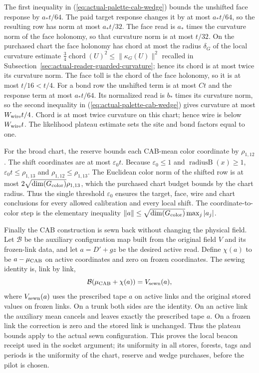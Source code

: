 The first inequality in (\ref{eq:actual-palette-cab-wedge}) bounds the
unshifted face response by $a_*t/64$. The paid target response changes it
by at most $a_*t/64$, so the resulting row has norm at most $a_*t/32$.
The face read is $a_*$ times the curvature norm of the face holonomy, so
that curvature norm is at most $t/32$. On the purchased chart the face
holonomy has chord at most the radius $\delta_G$ of the local curvature
estimate $\tfrac34\operatorname{chord}(U)^2\leq\|\kappa_G(U)\|^2$ recalled
in Subsection~\ref{sec:actual-reader-guarded-curvature}; hence its chord is at
most twice its curvature norm. The face toll is the chord of the face
holonomy, so it is at most $t/16<t/4$. For a bond row the unshifted term is at most $Ct$
and the response term at most $a_*t/64$. Its normalized read is $b_*$
times its curvature norm, so the second inequality in
(\ref{eq:actual-palette-cab-wedge}) gives curvature at most
$W_{\rm wire}t/4$. Chord is at most twice curvature on this chart; hence
wire is below $W_{\rm wire}t$. The likelihood plateau estimate sets the
site and bond factors equal to one.

For the broad chart, the reserve bounds each CAB-mean color coordinate by
$\rho_{1,12}$. The shift coordinates are at most $\varepsilon_0t$.
Because $\varepsilon_0\leq1$ and $\operatorname{radiusB}(x)\geq1$,
$\varepsilon_0t\leq\rho_{1,13}$ and $\rho_{1,12}\leq\rho_{1,13}$.
The Euclidean color norm of the shifted row is at most
$2\sqrt{\dim(G_{\rm color})}\rho_{1,13}$, which the purchased chart
budget bounds by the chart radius. Thus the single threshold
$\varepsilon_0$ ensures the target, face, wire and chart conclusions for
every allowed calibration and every local shift. The coordinate-to-color
step is the elementary inequality
$\|a\|\leq\sqrt{\dim(G_{\rm color})}\max_j|a_j|$.

Finally the CAB construction is sewn back without changing the physical
field. Let $\mathcal B$ be the auxiliary configuration map built from the
original field $V$ and its frozen-link data, and let $a=D'+gz$ be the desired
active read. Define $\chi(a)$ to be $a-\mu_{\rm CAB}$ on active coordinates
and zero on frozen coordinates. The sewing identity is, link by link,
\begin{equation}\label{eq:actual-palette-cab-shelter}
 \mathcal B(\mu_{\rm CAB}+\chi(a))=V_{\rm sewn}(a),
\end{equation}
where $V_{\rm sewn}(a)$ uses the prescribed tape $a$ on active links and
the original stored values on frozen links. On a trunk both sides are the
identity. On an active link the auxiliary mean cancels and leaves exactly
the prescribed tape $a$. On a frozen link the correction is zero and the
stored link is unchanged. Thus the plateau bounds
apply to the actual sewn configuration. This proves the local beacon
receipt used in the socket argument; its uniformity in all stores,
forests, tags and periods is the uniformity of the chart, reserve and
wedge purchases, before the pilot is chosen.


